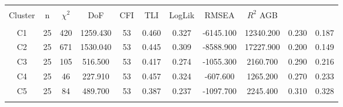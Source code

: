 
\begin{table}[!htbp] \centering 
  \caption{} 
  \label{full_model_fit_clust_stats} 
\begin{tabular}{@{\extracolsep{0pt}} ccccccccccc} 
\\[-1.8ex]\hline 
\hline \\[-1.8ex] 
{Cluster} & {n} & {$\chi^{2}$} & {DoF} & {CFI} & {TLI} & {LogLik} & {RMSEA} & {$R^{2}$ AGB} \\
\hline \\[-1.8ex] 
C1 & 25 & 420 & 1259.430 & 53 & 0.460 & 0.327 & -6145.100 & 12340.200 & 0.230 & 0.187 \\ 
C2 & 25 & 671 & 1530.040 & 53 & 0.445 & 0.309 & -8588.900 & 17227.900 & 0.200 & 0.149 \\ 
C3 & 25 & 105 & 516.500 & 53 & 0.417 & 0.274 & -1055.300 & 2160.700 & 0.290 & 0.216 \\ 
C4 & 25 & 46 & 227.910 & 53 & 0.457 & 0.324 & -607.600 & 1265.200 & 0.270 & 0.233 \\ 
C5 & 25 & 84 & 489.700 & 53 & 0.387 & 0.237 & -1097.700 & 2245.400 & 0.310 & 0.328 \\ 
\hline \\[-1.8ex] 
\end{tabular} 
\end{table} 

